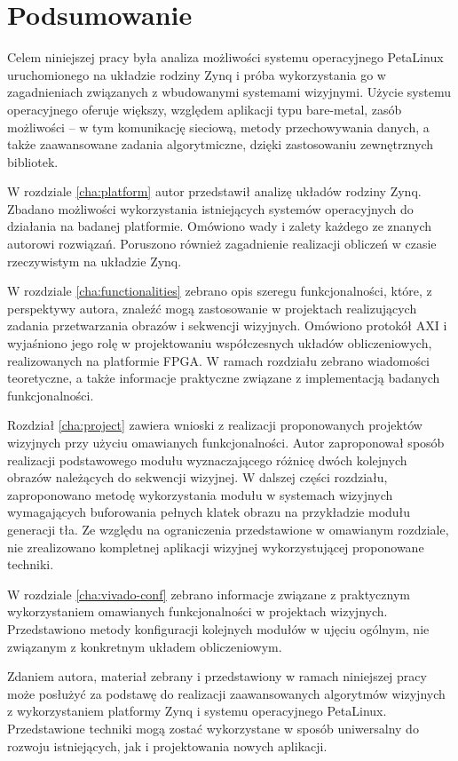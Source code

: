 \chapter{Podsumowanie}
\label{chap:summary}

Celem niniejszej pracy była analiza możliwości systemu operacyjnego PetaLinux uruchomionego na układzie rodziny Zynq i próba wykorzystania go w zagadnieniach związanych z wbudowanymi systemami wizyjnymi. Użycie systemu operacyjnego oferuje większy, względem aplikacji typu bare-metal, zasób możliwości -- w tym komunikację sieciową, metody przechowywania danych, a także zaawansowane zadania algorytmiczne, dzięki zastosowaniu zewnętrznych bibliotek.

W rozdziale \ref{cha:platform} autor przedstawił analizę układów rodziny Zynq. Zbadano możliwości wykorzystania istniejących systemów operacyjnych do działania na badanej platformie. Omówiono wady i zalety każdego ze znanych autorowi rozwiązań. Poruszono również zagadnienie realizacji obliczeń w czasie rzeczywistym na układzie Zynq.

W rozdziale \ref{cha:functionalities} zebrano opis szeregu funkcjonalności, które, z perspektywy autora, znaleźć mogą zastosowanie w projektach realizujących zadania przetwarzania obrazów i sekwencji wizyjnych. Omówiono protokół AXI i wyjaśniono jego rolę w projektowaniu współczesnych układów obliczeniowych, realizowanych na platformie FPGA. W ramach rozdziału zebrano wiadomości teoretyczne, a także informacje praktyczne związane z implementacją badanych funkcjonalności.

Rozdział \ref{cha:project} zawiera wnioski z realizacji proponowanych projektów wizyjnych przy użyciu omawianych funkcjonalności. Autor zaproponował sposób realizacji podstawowego modułu wyznaczającego różnicę dwóch kolejnych obrazów należących do sekwencji wizyjnej. W dalszej części rozdziału, zaproponowano  metodę wykorzystania modułu w systemach wizyjnych wymagających buforowania pełnych klatek obrazu na przykładzie modułu generacji tła. Ze względu na ograniczenia przedstawione w omawianym rozdziale, nie zrealizowano kompletnej aplikacji wizyjnej wykorzystującej proponowane techniki.

W rozdziale \ref{cha:vivado-conf} zebrano informacje związane z praktycznym wykorzystaniem omawianych funkcjonalności w projektach wizyjnych. Przedstawiono metody konfiguracji kolejnych modułów w ujęciu ogólnym, nie związanym z konkretnym układem obliczeniowym.

Zdaniem autora, materiał zebrany i przedstawiony w ramach niniejszej pracy może posłużyć za podstawę do realizacji zaawansowanych algorytmów wizyjnych z wykorzystaniem platformy Zynq i systemu operacyjnego PetaLinux. Przedstawione techniki mogą zostać wykorzystane w sposób uniwersalny do rozwoju istniejących, jak i projektowania nowych aplikacji.

